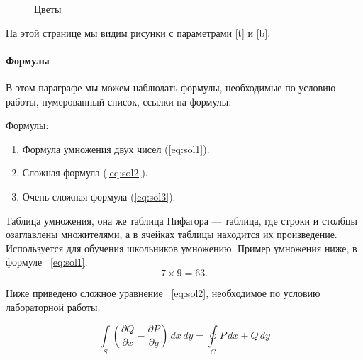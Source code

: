 \documentclass[a4paper,12pt]{article}         %
\begin{document}
\begin{figure}[b]
	\caption{Цветы}
	\label{fig:i3}
\end{figure}
\newpage
На этой странице мы видим рисунки с параметрами [t] и [b].
\newpage

\paragraph{Формулы}
В этом параграфе мы можем наблюдать формулы, необходимые по условию работы, нумерованный список, ссылки на формулы.

Формулы:
\begin{enumerate} 
	\item Формула  умножения двух чисел (\ref{eq:sol1}).
	\item Сложная формула (\ref{eq:sol2}).
	\item Очень сложная формула (\ref{eq:sol3}).
\end{enumerate}
Таблица умножения, она же таблица Пифагора — таблица, где строки и столбцы озаглавлены множителями, а в ячейках таблицы находится их произведение. Используется для обучения школьников умножению. Пример умножения ниже, в формуле ~\ref{eq:sol1}.
\begin{equation}
\label{eq:sol1}
7\times9=63.
\end{equation}


Ниже приведено сложное уравнение ~\ref{eq:sol2}, необходимое по условию лабораторной работы.

\begin{equation}\label{eq:sol2}
\int \limits_S \left( \frac{\partial Q}{\partial x} - \frac{\partial P}{\partial y} \right)\, dx \, dy =\oint \limits_C P\,dx + Q \, dy
\end{equation}
\end{document}
